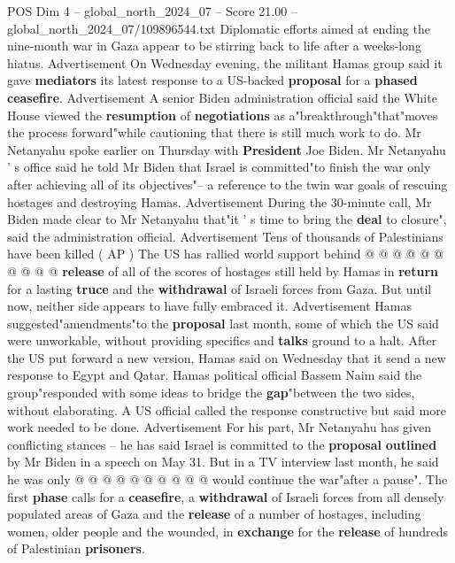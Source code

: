 \begin{textsample}{POS Dim 4 – global\_north\_2024\_07 – Score 21.00 – global\_north\_2024\_07/109896544.txt}  \label{ex:f4_pos_200}
Diplomatic efforts aimed at ending the nine-month war in Gaza appear to be stirring back to life after a weeks-long hiatus.
Advertisement On Wednesday evening, the militant Hamas group said it gave \textbf{mediators} its latest response to a US-backed \textbf{proposal} for a \textbf{phased} \textbf{ceasefire}.
Advertisement A senior Biden administration official said the White House viewed the \textbf{resumption} of \textbf{negotiations} as a"breakthrough"that"moves the process forward"while cautioning that there is still much work to do.
Mr Netanyahu spoke earlier on Thursday with \textbf{President} Joe Biden.
Mr Netanyahu ' s office said he told Mr Biden that Israel is committed"to finish the war only after achieving all of its objectives"-- a reference to the twin war goals of rescuing hostages and destroying Hamas.
Advertisement During the 30-minute call, Mr Biden made clear to Mr Netanyahu that"it ' s time to bring the \textbf{deal} to closure", said the administration official.
Advertisement Tens of thousands of Palestinians have been killed ( AP ) The US has rallied world support behind @ @ @ @ @ @ @ @ @ @ \textbf{release} of all of the scores of hostages still held by Hamas in \textbf{return} for a lasting \textbf{truce} and the \textbf{withdrawal} of Israeli forces from Gaza.
But until now, neither side appears to have fully embraced it.
Advertisement Hamas suggested"amendments"to the \textbf{proposal} last month, some of which the US said were unworkable, without providing specifics and \textbf{talks} ground to a halt.
After the US put forward a new version, Hamas said on Wednesday that it send a new response to Egypt and Qatar.
Hamas political official Bassem Naim said the group"responded with some ideas to bridge the \textbf{gap}"between the two sides, without elaborating.
A US official called the response constructive but said more work needed to be done.
Advertisement For his part, Mr Netanyahu has given conflicting stances -- he has said Israel is committed to the \textbf{proposal} \textbf{outlined} by Mr Biden in a speech on May 31.
But in a TV interview last month, he said he was only @ @ @ @ @ @ @ @ @ @ would continue the war"after a pause".
The first \textbf{phase} calls for a \textbf{ceasefire}, a \textbf{withdrawal} of Israeli forces from all densely populated areas of Gaza and the \textbf{release} of a number of hostages, including women, older people and the wounded, in \textbf{exchange} for the \textbf{release} of hundreds of Palestinian \textbf{prisoners}.

\end{textsample}
